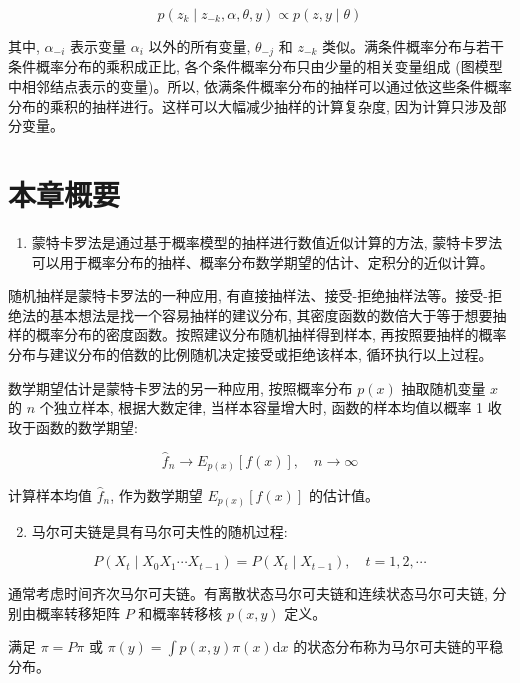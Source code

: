 \documentclass[10pt]{article}
\begin{document}
\begin{CJK*}{UTF8}{bsmi}
\begin{equation*}
p\left(z_{k} \mid z_{-k}, \alpha, \theta, y\right) \propto p(z, y \mid \theta) \tag{19.55}
\end{equation*}


其中, $\alpha_{-i}$ 表示变量 $\alpha_{i}$ 以外的所有变量, $\theta_{-j}$ 和 $z_{-k}$ 类似。满条件概率分布与若干条件概率分布的乘积成正比, 各个条件概率分布只由少量的相关变量组成 (图模型中相邻结点表示的变量)。所以, 依满条件概率分布的抽样可以通过依这些条件概率分布的乘积的抽样进行。这样可以大幅减少抽样的计算复杂度, 因为计算只涉及部分变量。

\section*{本章概要}
\begin{enumerate}
  \item 蒙特卡罗法是通过基于概率模型的抽样进行数值近似计算的方法, 蒙特卡罗法可以用于概率分布的抽样、概率分布数学期望的估计、定积分的近似计算。
\end{enumerate}

随机抽样是蒙特卡罗法的一种应用, 有直接抽样法、接受-拒绝抽样法等。接受-拒绝法的基本想法是找一个容易抽样的建议分布, 其密度函数的数倍大于等于想要抽样的概率分布的密度函数。按照建议分布随机抽样得到样本, 再按照要抽样的概率分布与建议分布的倍数的比例随机决定接受或拒绝该样本, 循环执行以上过程。

数学期望估计是蒙特卡罗法的另一种应用, 按照概率分布 $p(x)$ 抽取随机变量 $x$ 的 $n$ 个独立样本, 根据大数定律, 当样本容量增大时, 函数的样本均值以概率 1 收玫于函数的数学期望:

$$
\hat{f}_{n} \rightarrow E_{p(x)}[f(x)], \quad n \rightarrow \infty
$$

计算样本均值 $\hat{f}_{n}$, 作为数学期望 $E_{p(x)}[f(x)]$ 的估计值。

\begin{enumerate}
  \setcounter{enumi}{1}
  \item 马尔可夫链是具有马尔可夫性的随机过程:
\end{enumerate}

$$
P\left(X_{t} \mid X_{0} X_{1} \cdots X_{t-1}\right)=P\left(X_{t} \mid X_{t-1}\right), \quad t=1,2, \cdots
$$

通常考虑时间齐次马尔可夫链。有离散状态马尔可夫链和连续状态马尔可夫链, 分别由概率转移矩阵 $P$ 和概率转移核 $p(x, y)$ 定义。

满足 $\pi=P \pi$ 或 $\pi(y)=\int p(x, y) \pi(x) \mathrm{d} x$ 的状态分布称为马尔可夫链的平稳分布。


\end{CJK*}
\end{document}
